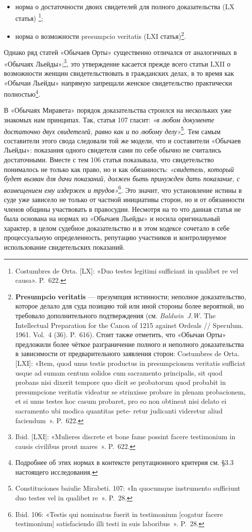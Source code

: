 \begin{itemize}
\item норма о достаточности двоих свидетелей для полного доказательства (LX статья) \footnote{Costumbres de Orta. [LX]: «Duo testes legitimi sufficiant in qualibet re vel causa». P.~622.};
\item норма о возможности presumpcio veritatis (LXI статья)\footnote{\textbf{Presumpcio}\textbf{ }\textbf{veritatis}\textbf{ }--- презумпция истинности; неполное доказательство, которое делало для суда позицию той или иной стороны более вероятной, но требовало дополнительного подтверждения (см. \emph{Baldwin~J.W. }The Intellectual Preparation for the Canon of 1215 against Ordeals // Speculum. 1961. Vol.~4 (36). P.~616). Стоит также отметить, что «Обычаи Орты» предложили более чёткое разграничение полного и неполного доказательства в зависимости от предварительного заявления сторон: Costumbres de Orta. [LXI]: «Item, quod unus testis productus in presumpcionem veritatis sufficiat usque ad sumam centum solidos cum sacramento principalis, sit quod probans nisi dixerit tempore quo dicit se probatorum quod probabit in presumpcione veritatis videatur se strinxisse probare in plenam probacionem, et si unus testes hoc casum probaret, pro eo non obtineat nisi delato ei sacramento ubi modica quantitas pete- retur judicanti videretur aliud faciendum~». P.~622.}.
\end{itemize}
Однако ряд статей «Обычаев Орты» существенно отличался от аналогичных в «Обычаях Льейды»;\footnote{Ibid. [LXI]: «Mulieres discrete et bone fame possint facere testimonium in causis civilibus prout mares~». P.~622.}, это утверждение касается прежде всего статьи LXII о возможности женщин свидетельствовать в гражданских делах, в то время как «Обычаи Льейды» напрямую запрещали женское свидетельство практически полностью\footnote{Подробнее об этих нормах в контексте репутационного критерия см. §3.3 настоящего исследования.}.

В «Обычаях Миравета» порядок доказательства строился на нескольких уже знакомых нам принципах. Так, статья 107 гласит: \emph{«в любом документе достаточно двух свидетелей, равно как и по любому делу»}\footnote{Constituciones baiulie Mirabeti. 107: «In quocumque instrumento sufficiunt duo testes vel in qualibet re~». P.~28.}. Тем самым составители этого свода следовали той же модели, что и составители «Обычаев Льейды»: показания одного свидетеля сами по себе обычно не считались достаточными. Вместе с тем 106 статья показывала, что свидетельство понималось не только как право, но и как обязанность: \emph{«свидетель, который будет вызван для дачи показаний, должен быть принужден дать показание, с возмещением ему издержек и трудов»}\footnote{Ibid. 106: «Testis qui nominatus fuerit in testimonium [cogatur facere testimonium] satisfaciendo illi testi in suis laboribus~». P.~28.}. Это значит, что установление истины в суде уже зависело не только от частной инициативы сторон, но и от обязанности членов общины участвовать в правосудии. Несмотря на то что данная статья не была основана на нормах из «Обычаев Льейды» и носила оригинальный характер, в целом судебное доказательство и в этом кодексе сочетало в себе процессуальную определенность, репутацию участников и контролируемое использование свидетельских показаний.

